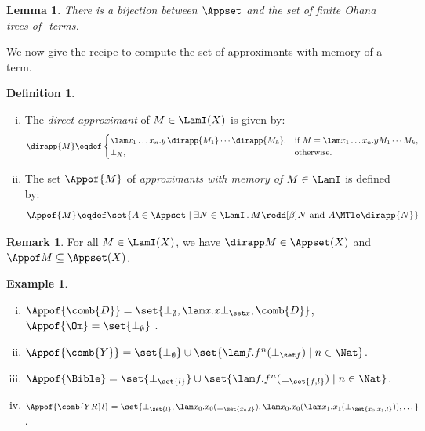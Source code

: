 \documentclass[10pt,a4paper]{amsart}
\newtheorem{lemma}[theorem]{Lemma}
\theoremstyle{definition}
\newtheorem{definition}[theorem]{Definition}
\newtheorem{example}[theorem]{Example}
\newtheorem{remark}[theorem]{Remark}
\newcommand{\bsub}{\begin{enumerate}[(i)]}
\newcommand{\esub}{\end{enumerate}}
\begin{document}
\setcounter{lem:bijAppsetfinmemtrees}{\thetheorem}
\begin{lemma}
\label{lem:bijAppset_finmemtrees}\label{lem:bijAppsetfinmemtrees}
There is a bijection between $\Appset$ and the set of finite Ohana trees of \lamI-terms.
\end{lemma}

We now give the recipe to compute the set of approximants with memory of a \lamI-term.

\begin{definition}\mbox{}
\bsub
\item The \emph{direct approximant} of $M\in\LamI(X)$ is given by:
\[
	\dirapp{M} \eqdef 
	\begin{cases}
	 \lam x_1\ldots x_n.y\,\dirapp{M_1}\cdots \dirapp{M_k},&\textrm{if }M = \lam x_1\ldots x_n.yM_1\cdots M_k,\\	
	\bot_X,&\textrm{otherwise.}
	\end{cases}
\]
\item The set $\Appof{M}$ of \emph{approximants with memory of $M\in\LamI$} is defined by:
\[
	\Appof{M} \eqdef \set{ A\in\Appset \mid \exists N\in\LamI\,.\, M\redd[\beta]N \textrm{ and }A\MTle \dirapp{N}}
\]
\esub
\end{definition}

\begin{remark} \label{rem:appof-M-fv-M}
	For all $M \in \LamI(X)$, we have $\dirapp M \in \Appset(X)$ and $\Appof M \subseteq \Appset(X)$.
\end{remark}

\begin{example}\mbox{}
\bsub
\item $\Appof{\comb{D}} = \set{\bot_\emptyset, \lam x.x\bot_{\set x}, 
		\comb{D}}$, 
	$\Appof{\Om} = \set{\bot_{\emptyset}}$%
	.
\item $\Appof{\comb{Y}} = \set{\bot_\emptyset} \cup 
		\set{ \lam f.f^n(\bot_{\set f}) \mid n\in\Nat} $.
\item $\Appof{\Bible} = \set{\bot_{\set{l}}} \cup 
		\set{ \lam f.f^n(\bot_{\set{f,l}}) \mid n\in\Nat} $.
\item $\Appof{\comb{YR}l} = \set{\bot_{\set{l}},
	\lam x_0.x_0(\bot_{\set{x_0,l}}),
	\lam x_0.x_0(\lam x_1.x_1(\bot_{\set{x_0,x_1,l}})), \dots}$.
\esub
\end{example}
\end{document}
